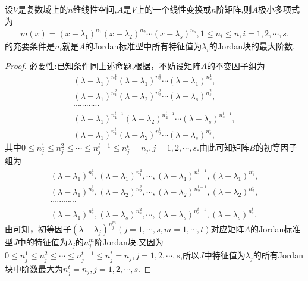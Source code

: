 \documentclass[../../main.tex]{subfiles}
\begin{document}
\begin{proposition}\label{proposition:极小多项式对应Jordan标准型的最大块}
设$V$是复数域上的$n$维线性空间,$A$是$V$上的一个线性变换或$n$阶矩阵,则$A$极小多项式为
\begin{align*}
m(x)=\left( x-\lambda _1 \right) ^{n_1}\left( x-\lambda _2 \right)^{n_2}\cdots \left( x-\lambda _s \right) ^{n_s},1\leqslant n_i\leqslant n,i=1,2,\cdots ,s.
\end{align*}
的充要条件是$n_i$就是$A$的Jordan标准型中所有特征值为$\lambda_i$的Jordan块的最大阶数.
\end{proposition}
\begin{proof}
{\heiti 必要性:}已知条件同上述命题,根据，不妨设矩阵$A$的不变因子组为
\begin{gather*}
\left( \lambda -\lambda _1 \right) ^{n_{1}^{1}}\left( \lambda -\lambda _1 \right) ^{n_{2}^{1}}\cdots \left( \lambda -\lambda _1 \right) ^{n_{s}^{1}},
\\
\left( \lambda -\lambda _1 \right) ^{n_{1}^{2}}\left( \lambda -\lambda _2 \right) ^{n_{2}^{2}}\cdots \left( \lambda -\lambda _s \right) ^{n_{s}^{2}},
\\
\cdots \cdots \cdots \cdots 
\\
\left( \lambda -\lambda _1 \right) ^{n_{1}^{t-1}}\left( \lambda -\lambda _2 \right) ^{n_{2}^{t-1}}\cdots \left( \lambda -\lambda _s \right) ^{n_{s}^{t-1}},
\\
\left( \lambda -\lambda _1 \right) ^{n_{1}^{t}}\left( \lambda -\lambda _2 \right) ^{n_{2}^{t}}\cdots \left( \lambda -\lambda _s \right) ^{n_{s}^{t}},
\end{gather*}
其中$0 \leqslant n_j^1 \leqslant n_j^2 \leqslant \cdots \leqslant n_j^{t-1} \leqslant n_j^t = n_j, j = 1,2,\cdots,s$.由此可知矩阵$B$的初等因子组为
\begin{gather*}
\left( \lambda -\lambda _1 \right) ^{n_{1}^{1}},\left( \lambda -\lambda _1 \right) ^{n_{1}^{2}},\cdots ,\left( \lambda -\lambda _1 \right) ^{n_{1}^{t-1}},\left( \lambda -\lambda _1 \right) ^{n_{1}^{t}},
\\
\left( \lambda -\lambda _1 \right) ^{n_{2}^{1}},\left( \lambda -\lambda _2 \right) ^{n_{2}^{2}},\cdots ,\left( \lambda -\lambda _2 \right) ^{n_{2}^{t-1}},\left( \lambda -\lambda _2 \right) ^{n_{2}^{t}},
\\
\cdots \cdots \cdots \cdots 
\\
\left( \lambda -\lambda _1 \right) ^{n_{s}^{1}},\left( \lambda -\lambda _s \right) ^{n_{s}^{2}},\cdots ,\left( \lambda -\lambda _s \right) ^{n_{s}^{t-1}},\left( \lambda -\lambda _s \right) ^{n_{s}^{t}}.
\end{gather*}
由可知，初等因子$(\lambda - \lambda_j)^{n_j^m}(j = 1,\cdots,s,m = 1,\cdots,t)$对应矩阵$A$的Jordan标准型$J$中的特征值为$\lambda_j$的$n_j^m$阶Jordan块.又因为$0 \leqslant n_j^1 \leqslant n_j^2 \leqslant \cdots \leqslant n_j^{t-1} \leqslant n_j^t = n_j,j = 1,2,\cdots,s$,所以$J$中特征值为$\lambda_j$的所有Jordan块中阶数最大为$n_j^t = n_j,j = 1,2,\cdots,s$.


\end{proof}
\end{document}
